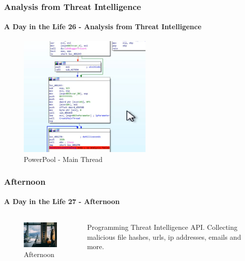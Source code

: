 \documentclass[aspectratio=169]{beamer}
\begin{document}
\begin{frame}
  \frametitle{Analysis from Threat Intelligence}
  \framesubtitle{A Day in the Life 26 - Analysis from Threat Intelligence}
  \begin{center}
    \begin{figure}
      \includegraphics[width=6.5cm,keepaspectratio]{powerpool_main_thread}
      \caption{PowerPool - Main Thread}
    \end{figure}
  \end{center}
\end{frame}

\begin{frame}
  \frametitle{Afternoon}
  \framesubtitle{A Day in the Life 27 - Afternoon}
  \begin{columns}[onlytextwidth]
    \begin{column}{.30\textwidth}
      \begin{figure}
        \includegraphics[width=5.5cm,keepaspectratio]{afternoon}
        \caption{Afternoon}
      \end{figure}
    \end{column}
    \hfill
    \begin{column}{.60\textwidth}
        \begin{tcolorbox}[title=programming.log,colback=gray]
         Programming Threat Intelligence API. Collecting malicious file hashes, urls, ip addresses, emails and more. 
        \end{tcolorbox}
    \end{column}
  \end{columns}
\end{frame}
\end{document}
